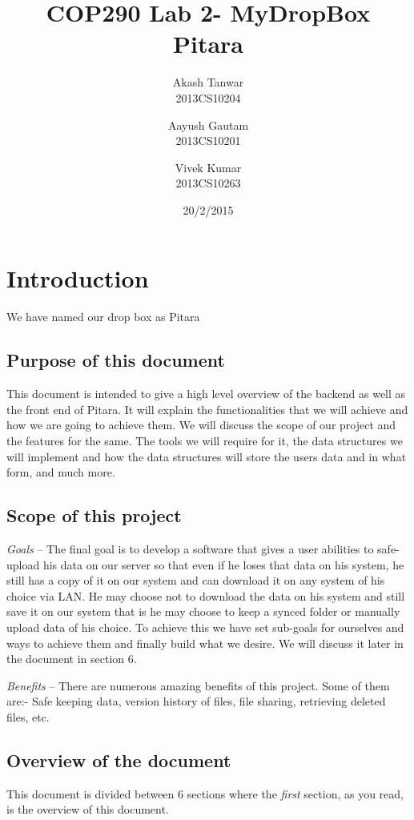 \documentclass{article}
\title{COP290 Lab 2- MyDropBox\\
	Pitara}
\date{20/2/2015}
\author{Akash Tanwar\\
		2013CS10204
		 \and
		 Aayush Gautam\\
		 2013CS10201
		 \and
		 Vivek Kumar\\
		 2013CS10263
	   }
\begin{document}
	\maketitle
	\tableofcontents
	\newpage
	\section{Introduction}\label{intro}
	\begin{center}
	We have named our drop box as Pitara
	\end{center}
	\subsection{Purpose of this document}
	This document is intended to give a high level overview of the backend as well as the front end of Pitara. It will explain the functionalities that we will achieve and how we are going to achieve them. We will discuss the scope of our project and the features for the same. The tools we will require for it, the data structures we will implement and how the data structures will store the users data and in what form, and much more.

	\subsection{Scope of this project}
	 \emph{Goals} -- The final goal is to develop a software that gives a user abilities to safe-upload his data on our server so that even if he loses that data on his system, he still has a copy of it on our system and can download it on any system of his choice via LAN. He may choose not to download the data on his system and still save it on our system that is he may choose to keep a synced folder or manually upload data of his choice. To achieve this we have set sub-goals for ourselves and ways to achieve them and finally build what we desire. We will discuss it later in the document in section 6.
            
               \emph{Benefits} -- There are numerous amazing benefits of this project. Some of them are:- Safe keeping data, version history of files, file sharing, retrieving deleted files, etc.
	\subsection{Overview of the document}
	This document is divided between 6 sections where the \emph{first} section, as you read, is the overview of this document.
\end{document}
